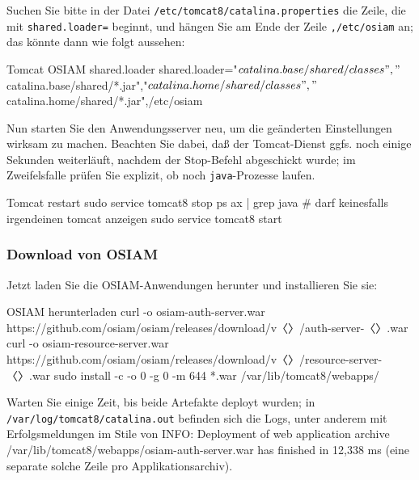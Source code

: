 \begin{minipage}{\linewidth}
Suchen Sie bitte in der Datei \texttt{/etc/tomcat8/catalina.properties}
die Zeile, die mit \texttt{shared.loader=} beginnt, und hängen Sie am
Ende der Zeile \texttt{,/etc/osiam} an; das könnte dann wie folgt aussehen:

\begin{lstdump}{Tomcat OSIAM shared.loader}
shared.loader="${catalina.base}/shared/classes","${catalina.base}/shared/*.jar","${catalina.home}/shared/classes","${catalina.home}/shared/*.jar",/etc/osiam
\end{lstdump}
\end{minipage}

Nun starten Sie den Anwendungsserver neu, um die geänderten
Einstellungen wirksam zu machen. Beachten Sie dabei, daß der
Tomcat-Dienst ggfs. noch einige Sekunden weiterläuft, nachdem
der Stop-Befehl abgeschickt wurde; im Zweifelsfalle prüfen Sie
explizit, ob noch \texttt{java}-Prozesse laufen.\keinumbruch

\begin{minipage}{\linewidth}
\begin{lstdump}{Tomcat restart}
sudo service tomcat8 stop
ps ax | grep java # darf keinesfalls irgendeinen tomcat anzeigen
sudo service tomcat8 start
\end{lstdump}
\end{minipage}

\subsubsection{Download von OSIAM}\label{subsubsec:setup-osiam-download}

\begin{minipage}{\linewidth}
Jetzt laden Sie die OSIAM-Anwendungen herunter und installieren Sie sie:

\begin{lstdump}{OSIAM herunterladen}
curl -o osiam-auth-server.war https://github.com/osiam/osiam/releases/download/v〈\lstdumpesc{\vwiaversosiam}〉/auth-server-〈\lstdumpesc{\vwiaversosiam}〉.war
curl -o osiam-resource-server.war https://github.com/osiam/osiam/releases/download/v〈〉/resource-server-〈〉.war
sudo install -c -o 0 -g 0 -m 644 *.war /var/lib/tomcat8/webapps/
\end{lstdump}
\end{minipage}

Warten Sie einige Zeit, bis beide Artefakte deployt wurden; in
\texttt{/var/log/tomcat8/catalina.out} befinden sich die Logs,
unter anderem mit Erfolgsmeldungen im Stile von {\ttfamily
INFO: Deployment of web application archive
/var/lib/tomcat8/webapps/osiam-auth-server.war has finished
in 12,338 ms} (eine separate solche Zeile pro Applikationsarchiv).


